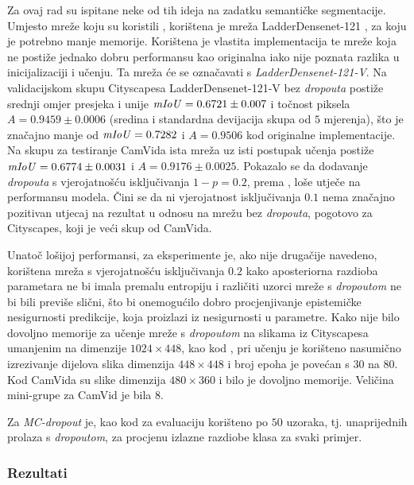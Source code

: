 \documentclass[utf8, diplomski, lmodern]{fer}
\begin{document}
Za ovaj rad su ispitane neke od tih ideja na zadatku semantičke segmentacije. Umjesto mreže koju su koristili \citet{Kendall:2017:WUNBDLCV}, korištena je mreža LadderDensenet-121 \citep{Kreso:2017:LSDFSSLNI}, za koju je potrebno manje memorije. Korištena je vlastita implementacija te mreže koja ne postiže jednako dobru performansu kao originalna iako nije poznata razlika u inicijalizaciji i učenju. Ta mreža će se označavati s \textit{LadderDensenet-121-V}. Na validacijskom skupu Cityscapesa \citep{Cordts:2016:Cityscapes} LadderDensenet-121-V bez \textit{dropouta} postiže srednji omjer presjeka i unije $\mathit{mIoU}=0.6721\pm0.007$ i točnost piksela $A=0.9459\pm0.0006$ (sredina i standardna devijacija skupa od $5$ mjerenja), što je značajno manje od $\mathit{mIoU}=0.7282$ i $A=0.9506$ kod originalne implementacije. Na skupu za testiranje CamVida \citep{Brostow:2008:CamVid} ista mreža uz isti postupak učenja postiže $\mathit{mIoU}=0.6774\pm0.0031$ i $A=0.9176\pm0.0025$. Pokazalo se da dodavanje \textit{dropouta} s vjerojatnošću isključivanja $1-p=0.2$, prema \citep{Huang:2016:DCCN}, loše utječe na performansu modela. Čini se da ni vjerojatnost isključivanja $0.1$ nema značajno pozitivan utjecaj na rezultat u odnosu na mrežu bez \textit{dropouta}, pogotovo za Cityscapes, koji je veći skup od CamVida. 

Unatoč lošijoj performansi, za eksperimente je, ako nije drugačije navedeno, korištena mreža s vjerojatnošću isključivanja $0.2$ kako aposteriorna razdioba parametara ne bi imala premalu entropiju i različiti uzorci mreže s \textit{dropoutom} ne bi bili previše slični, što bi onemogućilo dobro procjenjivanje epistemičke nesigurnosti predikcije, koja proizlazi iz nesigurnosti u parametre. Kako nije bilo dovoljno memorije za učenje mreže s \textit{dropoutom} na slikama iz Cityscapesa umanjenim na dimenzije $1024\times448$, kao kod \citet{Kreso:2017:LSDFSSLNI}, pri učenju je korišteno nasumično izrezivanje dijelova slika dimenzija $448\times448$ i broj epoha je povećan s $30$ na $80$. Kod CamVida su slike dimenzija $480\times360$ i bilo je dovoljno memorije. Veličina mini-grupe za CamVid je bila $8$. 

Za \textit{MC-dropout} je, kao kod \cite{Kendall:2017:WUNBDLCV} za evaluaciju korišteno po $50$ uzoraka, tj. unaprijednih prolaza s \textit{dropoutom}, za procjenu izlazne razdiobe klasa za svaki primjer.

\subsubsection{Rezultati}
\end{document}
